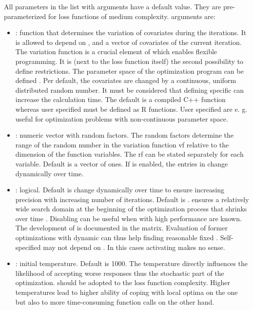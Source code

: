 All parameters in the list with  arguments have a default value. They are pre-parameterized for loss functions of medium complexity.  arguments are:
\begin{itemize}
	\item {}: function that determines the variation of covariates during the iterations. It is allowed to depend on ,  and a vector of covariates of the current iteration. The variation function is a crucial element of  which enables flexible programming. It is (next to the loss function itself) the second possibility to define restrictions. The parameter space of the optimization program can be defined . Per default, the covariates are changed by a continuous, uniform distributed random number. It must be considered that defining specific  can increase the calculation time. The default  is a compiled C++ function whereas user specified  must be defined as R functions. User specified are e. g. useful for optimization problems with non-continuous parameter space.
	\item {}: numeric vector with random factors. The random factors determine the range of the random number in the variation function vf relative to the dimension of the function variables. The rf can be stated separately for each variable. Default is a vector of ones. If  is enabled, the entries in  change dynamically over time.
	\item {}: logical. Default is   change dynamically over time to ensure increasing precision with increasing number of iterations. Default is .  ensures a relatively wide search domain at the beginning of the optimization process that shrinks over time \citep{corana_1987, pronzato_1984}. Disabling  can be useful when  with high performance are known. The development of  is documented in the  matrix. Evaluation of former optimizations with dynamic  can thus help finding reasonable fixed . Self-specified  may not depend on . In this cases activating  makes no sense.
	\item {}: initial temperature. Default is 1000. The temperature directly influences the likelihood of accepting worse responses thus the stochastic part of the optimization.  should be adopted to the loss function complexity. Higher temperatures lead to higher ability of coping with local optima on the one but also to more time-consuming function calls on the other hand.

\end{itemize}
